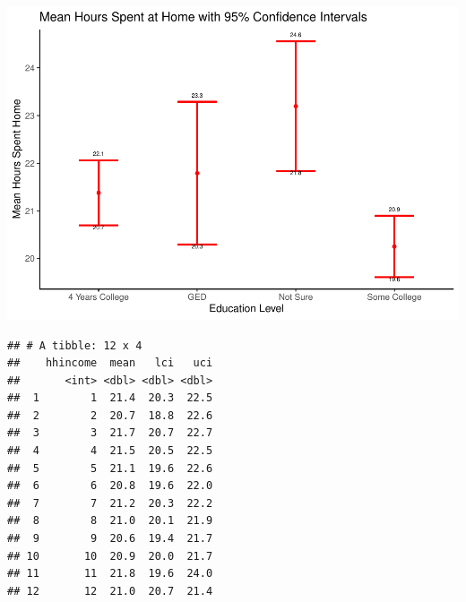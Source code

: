 \documentclass[
  11 pt,
]{article}
\newenvironment{Shaded}{\begin{snugshade}}{\end{snugshade}}
\newcommand{\AttributeTok}[1]{\textcolor[rgb]{0.77,0.63,0.00}{#1}}
\newcommand{\CommentTok}[1]{\textcolor[rgb]{0.56,0.35,0.01}{\textit{#1}}}
\newcommand{\ConstantTok}[1]{\textcolor[rgb]{0.00,0.00,0.00}{#1}}
\newcommand{\DecValTok}[1]{\textcolor[rgb]{0.00,0.00,0.81}{#1}}
\newcommand{\FloatTok}[1]{\textcolor[rgb]{0.00,0.00,0.81}{#1}}
\newcommand{\FunctionTok}[1]{\textcolor[rgb]{0.00,0.00,0.00}{#1}}
\newcommand{\NormalTok}[1]{#1}
\newcommand{\OtherTok}[1]{\textcolor[rgb]{0.56,0.35,0.01}{#1}}
\newcommand{\SpecialCharTok}[1]{\textcolor[rgb]{0.00,0.00,0.00}{#1}}
\begin{document}
\includegraphics{finalreport_template_files/figure-latex/confidence_interval_plots-2.pdf}

\begin{Shaded}
\end{Shaded}

\begin{verbatim}
## # A tibble: 12 x 4
##    hhincome  mean   lci   uci
##       <int> <dbl> <dbl> <dbl>
##  1        1  21.4  20.3  22.5
##  2        2  20.7  18.8  22.6
##  3        3  21.7  20.7  22.7
##  4        4  21.5  20.5  22.5
##  5        5  21.1  19.6  22.6
##  6        6  20.8  19.6  22.0
##  7        7  21.2  20.3  22.2
##  8        8  21.0  20.1  21.9
##  9        9  20.6  19.4  21.7
## 10       10  20.9  20.0  21.7
## 11       11  21.8  19.6  24.0
## 12       12  21.0  20.7  21.4
\end{verbatim}
\end{document}

